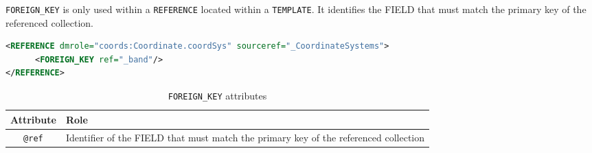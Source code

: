 \texttt{FOREIGN\_KEY} is only used within a \texttt{REFERENCE} located within a \texttt{TEMPLATE}.
It identifies the FIELD that must  match the primary key of the referenced collection.

\begin{lstlisting}[caption={The \texttt{REFERENCE} is resolved by the \texttt{INSTANCE} of table \_CoordinateSystems that has a primary key equals to the value of the column  \_band},language=XML]
<REFERENCE dmrole="coords:Coordinate.coordSys" sourceref="_CoordinateSystems">
      <FOREIGN_KEY ref="_band"/>
</REFERENCE>
\end{lstlisting}

\begin{table}[!htbp]
\small
\centering
\begin{tabulary}{\linewidth}{|c|J|}       
       \hline 
            \textbf{Attribute} & 
            \textbf {Role}\\
       \hline         \hline  
             \texttt{@ref} &
             Identifier of the FIELD that must  match the primary key of the referenced collection \\
     \hline
     \end{tabulary}
     \caption{\texttt{FOREIGN\_KEY} attributes} 
     \label{tbl:foreignkey-att}
 \end{table}

